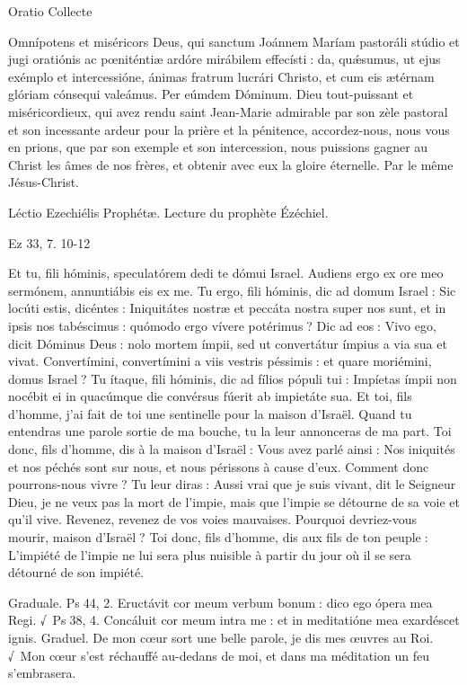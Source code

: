 \begin{paracol}{2}
Oratio
\switchcolumn
Collecte
\switchcolumn*

Omnípotens et miséricors Deus,  qui sanctum Joánnem Maríam pastoráli stúdio et jugi oratiónis ac pœniténtiæ ardóre mirábilem effecísti : da, quǽsumus, ut ejus exémplo et intercessióne, ánimas fratrum lucrári Christo, et cum eis ætérnam glóriam cónsequi valeámus. Per eúmdem Dóminum.
\switchcolumn
Dieu tout-puissant et miséricordieux,  qui avez rendu saint Jean-Marie admirable par son zèle pastoral et son incessante ardeur pour la prière et la pénitence, accordez-nous, nous vous en prions, que par son exemple et son intercession, nous puissions gagner au Christ les âmes de nos frères, et obtenir avec eux la gloire éternelle. Par le même Jésus-Christ.
\switchcolumn*

Léctio Ezechiélis Prophétæ.
\switchcolumn
Lecture du prophète Ézéchiel.
\switchcolumn*

Ez 33, 7. 10-12
\switchcolumn

\switchcolumn*

Et tu, fili hóminis, speculatórem  dedi te dómui Israel. Audiens ergo ex ore meo sermónem, annuntiábis eis ex me. Tu ergo, fili hóminis, dic ad domum Israel : Sic locúti estis, dicéntes : Iniquitátes nostræ et peccáta nostra super nos sunt, et in ipsis nos tabéscimus : quómodo ergo vívere potérimus ? Dic ad eos : Vivo ego, dicit Dóminus Deus : nolo mortem ímpii, sed ut convertátur ímpius a via sua et vivat. Convertímini, convertímini a viis vestris péssimis : et quare moriémini, domus Israel ? Tu ítaque, fili hóminis, dic ad fílios pópuli tui : Impíetas ímpii non nocébit ei in quacúmque die convérsus fúerit ab impietáte sua.
\switchcolumn
Et toi, fils d’homme, j’ai fait de toi une  sentinelle pour la maison d’Israël. Quand tu entendras une parole sortie de ma bouche, tu la leur annonceras de ma part. Toi donc, fils d’homme, dis à la maison d’Israël : Vous avez parlé ainsi : Nos iniquités et nos péchés sont sur nous, et nous périssons à cause d’eux. Comment donc pourrons-nous vivre ? Tu leur diras : Aussi vrai que je suis vivant, dit le Seigneur Dieu, je ne veux pas la mort de l’impie, mais que l’impie se détourne de sa voie et qu’il vive. Revenez, revenez de vos voies mauvaises. Pourquoi devriez-vous mourir, maison d’Israël ? Toi donc, fils d’homme, dis aux fils de ton peuple : L’impiété de l’impie ne lui sera plus nuisible à partir du jour où il se sera détourné de son impiété.
\switchcolumn*

Graduale. Ps 44, 2. Eructávit cor meum verbum bonum : dico ego ópera mea Regi. √~Ps 38, 4. Concáluit cor meum intra me : et in meditatióne mea exardéscet ignis.
\switchcolumn
Graduel. De mon cœur sort une belle parole, je dis mes œuvres au Roi. √~Mon cœur s’est réchauffé au-dedans de moi, et dans ma méditation un feu s’embrasera.
\switchcolumn*


\end{paracol}
